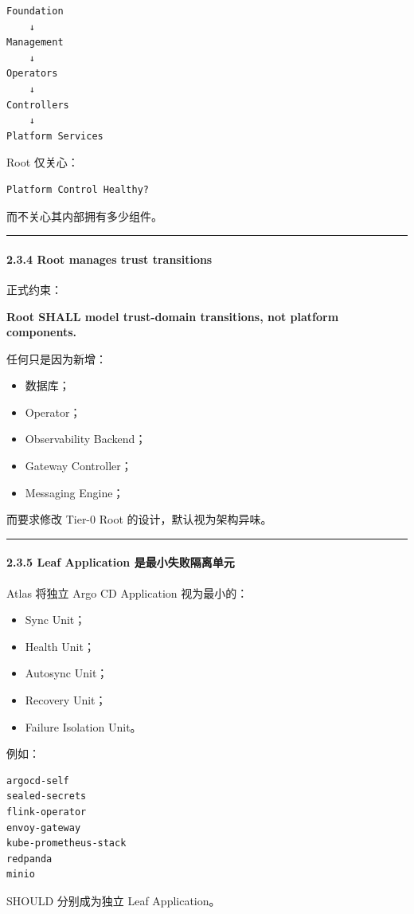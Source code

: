 \documentclass[11pt,a4paper]{article}
\begin{document}
\begin{lstlisting}[language=text]
Foundation
    ↓
Management
    ↓
Operators
    ↓
Controllers
    ↓
Platform Services
\end{lstlisting}
Root 仅关心：

\begin{lstlisting}[language=text]
Platform Control Healthy?
\end{lstlisting}
而不关心其内部拥有多少组件。

\vspace{0.5em}\hrule\vspace{0.5em}
\paragraph{2.3.4 Root manages trust transitions}
正式约束：

\begin{gfmBlockquote}
\textbf{Root SHALL model trust-domain transitions, not platform components.}
\end{gfmBlockquote}
任何只是因为新增：

\begin{itemize}
  \item 数据库；
  \item Operator；
  \item Observability Backend；
  \item Gateway Controller；
  \item Messaging Engine；
\end{itemize}
而要求修改 Tier-0 Root 的设计，默认视为架构异味。

\vspace{0.5em}\hrule\vspace{0.5em}
\paragraph{2.3.5 Leaf Application 是最小失败隔离单元}
Atlas 将独立 Argo CD Application 视为最小的：

\begin{itemize}
  \item Sync Unit；
  \item Health Unit；
  \item Autosync Unit；
  \item Recovery Unit；
  \item Failure Isolation Unit。
\end{itemize}
例如：

\begin{lstlisting}[language=text]
argocd-self
sealed-secrets
flink-operator
envoy-gateway
kube-prometheus-stack
redpanda
minio
\end{lstlisting}
SHOULD 分别成为独立 Leaf Application。
\end{document}
